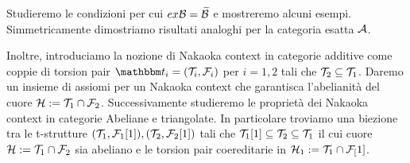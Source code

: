 Studieremo le condizioni per cui $ex\mathcal{B}=\widetilde{\mathcal{B}}$ e mostreremo alcuni esempi. Simmetricamente dimostriamo risultati analoghi per la categoria esatta $\mathcal{A}$.

Inoltre, introduciamo la nozione di Nakaoka context in categorie additive come coppie di torsion pair $\t_i=(\T_i,\F_i)$ per $i=1,2$ tali che $\mathcal{T}_2\subseteq \mathcal{T}_1$. Daremo un insieme di assiomi per un Nakaoka context che garantisca l'abelianit\`a del cuore $\mathcal{H}:=\mathcal{T}_1\cap\mathcal{F}_2$. Successivamente studieremo le propriet\`a dei Nakaoka context in categorie Abeliane e triangolate. In particolare troviamo una biezione tra le t-strutture $(\mathcal{T}_1,\mathcal{F}_1[1]), (\mathcal{T}_2,\mathcal{F}_2[1])$ tali che $\mathcal{T}_1[1]\subseteq\mathcal{T}_2\subseteq\mathcal{T}_1$ il cui cuore $\mathcal{H}:=\mathcal{T}_1\cap\mathcal{F}_2$ sia abeliano e le torsion pair coereditarie in $\mathcal{H}_1:=\mathcal{T}_1\cap\mathcal{F}_[1]$.


\endgroup


\vfill
